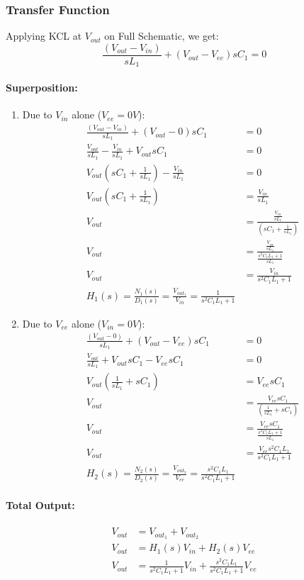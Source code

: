 \subsubsection{Transfer Function}
Applying KCL at $V_{out}$ on Full Schematic, we get:
\[
  \frac{(V_{out} - V_{in})}{sL_1} + (V_{out} - V_{ee}){sC_1} = 0
\]
\paragraph{Superposition:}
\begin{enumerate}
  \item Due to \(V_{in}\) alone (\(V_{ee} = 0V\)):
    \begin{align*}
      \frac{(V_{out} - V_{in})}{sL_1} + (V_{out} - 0)sC_1 &= 0 \\
      \frac{V_{out}}{sL_1} - \frac{V_{in}}{sL_1} + V_{out}sC_1 &= 0 \\
      V_{out}(sC_1 + \frac{1}{sL_1}) - \frac{V_{in}}{sL_1} &= 0 \\
      V_{out}(sC_1 + \frac{1}{sL_1}) &= \frac{V_{in}}{sL_1} \\
      V_{out} &= \frac{\frac{V_{in}}{sL_1}}{(sC_1 + \frac{1}{sL_1})} \\
      V_{out} &= \frac{\frac{V_{in}}{sL_1}}{\frac{s^2C_1L_1 + 1}{sL_1}} \\
      V_{out} &= \frac{V_{in}}{s^2C_1L_1 + 1} \\
      \boxed{H_1(s) = \frac{N_1(s)}{D_1(s)} = \frac{V_{out_1}}{V_{in}} = \frac{1}{s^2C_1L_1 + 1}}
    \end{align*}
  \item Due to \(V_{ee}\) alone (\(V_{in} = 0V\)):
    \begin{align*}
      \frac{(V_{out} - 0)}{sL_1} + (V_{out} - V_{ee})sC_1 &= 0 \\
      \frac{V_{out}}{sL_1} + V_{out}sC_1 - V_{ee}sC_1 &= 0 \\
      V_{out}(\frac{1}{sL_1} + sC_1) &= V_{ee}sC_1 \\
      V_{out} &= \frac{V_{ee}sC_1}{(\frac{1}{sL_1} + sC_1)} \\
      V_{out} &= \frac{V_{ee}sC_1}{\frac{s^2C_1L_1 + 1}{sL_1}} \\
      V_{out} &= \frac{V_{ee}s^2C_1L_1}{s^2C_1L_1 + 1} \\
      \boxed{H_2(s) = \frac{N_2(s)}{D_2(s)} = \frac{V_{out_2}}{V_{ee}} = \frac{s^2C_1L_1}{s^2C_1L_1 + 1}}
    \end{align*}
\end{enumerate}
\paragraph{Total Output:}
\begin{align*}
  V_{out} &= V_{out_1} + V_{out_2} \\
  V_{out} &= H_1(s)V_{in} + H_2(s)V_{ee} \\
  V_{out} &= \frac{1}{s^2C_1L_1 + 1}V_{in} + \frac{s^2C_1L_1}{s^2C_1L_1 + 1}V_{ee} \\
\end{align*}

